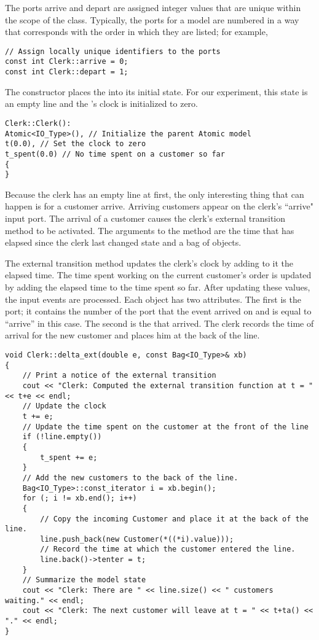 The ports arrive and depart are assigned integer values that are unique within the scope of the  class. Typically, the ports for a model are numbered in a way that corresponds with the order in which they are listed; for example,
\begin{verbatim}
// Assign locally unique identifiers to the ports
const int Clerk::arrive = 0;
const int Clerk::depart = 1;
\end{verbatim}

The  constructor places the  into its initial state. For our experiment, this state is an empty line and the 's clock is initialized to zero.
\begin{verbatim}
Clerk::Clerk():
Atomic<IO_Type>(), // Initialize the parent Atomic model
t(0.0), // Set the clock to zero
t_spent(0.0) // No time spent on a customer so far
{
}
\end{verbatim}

Because the clerk has an empty line at first, the only interesting thing that can happen is for a customer arrive. Arriving customers appear on the clerk's ``arrive" input port. The arrival of a customer causes the clerk's external transition method to be activated. The arguments to the method are the time that has elapsed since the clerk last changed state and a bag of  objects.

The external transition method updates the clerk's clock by adding to it the elapsed time. The time spent working on the current customer's order is updated by adding the elapsed time to the time spent so far. After updating these values, the input events are processed. Each  object has two attributes. The first is the port; it contains the number of the port that the event arrived on and is equal to ``arrive'' in this case. The second is the  that arrived. The clerk records the time of arrival for the new customer and places him at the back of the line.
\begin{verbatim}
void Clerk::delta_ext(double e, const Bag<IO_Type>& xb)
{
    // Print a notice of the external transition
    cout << "Clerk: Computed the external transition function at t = " << t+e << endl;
    // Update the clock
    t += e;
    // Update the time spent on the customer at the front of the line
    if (!line.empty())
    {
        t_spent += e;
    }
    // Add the new customers to the back of the line.
    Bag<IO_Type>::const_iterator i = xb.begin();
    for (; i != xb.end(); i++)
    {
        // Copy the incoming Customer and place it at the back of the line.
        line.push_back(new Customer(*((*i).value)));
        // Record the time at which the customer entered the line.
        line.back()->tenter = t;
    }
    // Summarize the model state
    cout << "Clerk: There are " << line.size() << " customers waiting." << endl;
    cout << "Clerk: The next customer will leave at t = " << t+ta() << "." << endl;
}
\end{verbatim}

